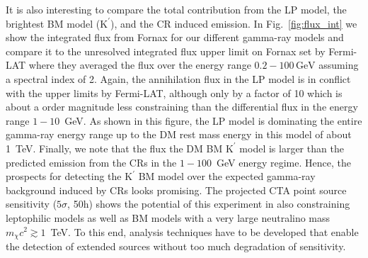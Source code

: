 \documentclass[10pt,aps,pra,reprint,amsmath,amsfonts,amssymb,showpacs,nofootinbib,floatfix]{revtex4-1}
\newcommand{\rmn}{\mathrm}
\newcommand{\Kp}{\rmn{K}^\prime}
\newcommand{\gev}{\rmn{GeV}}
\begin{document}
It is also interesting to compare the total contribution from the LP
model, the brightest BM model ($\Kp$), and the CR induced emission. In
Fig.~\ref{fig:flux_int} we show the integrated flux from Fornax for
our different gamma-ray models and compare it to the unresolved
integrated flux upper limit on Fornax set by Fermi-LAT where they
averaged the flux over the energy range $0.2-100\,\gev$ assuming a
spectral index of 2. Again, the annihilation flux in the LP model is
in conflict with the upper limits by Fermi-LAT, although only by a
factor of 10 which is about a order magnitude less constraining than
the differential flux in the energy range $1-10$~GeV. As shown in this
figure, the LP model is dominating the entire gamma-ray energy range
up to the DM rest mass energy in this model of about 1~TeV. Finally,
we note that the flux the DM BM $\Kp$ model is larger than the predicted
emission from the CRs in the $1-100$~GeV energy regime. Hence, the
prospects for detecting the $\Kp$ BM model over the expected gamma-ray
background induced by CRs looks promising. The projected CTA point
source sensitivity ($5\sigma$, 50h) shows the potential of this
experiment in also constraining leptophilic models as well as BM
models with a very large neutralino mass $m_\chi c^2 \gtrsim
1$~TeV. To this end, analysis techniques have to be developed that
enable the detection of extended sources without too much degradation
of sensitivity.
\end{document}
